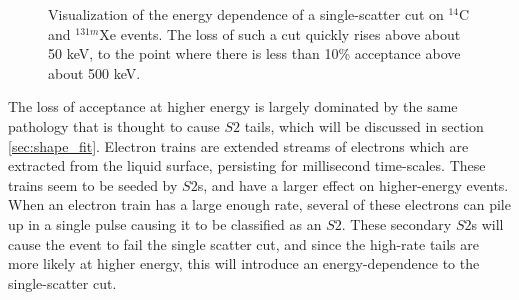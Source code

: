 {\begin{figure}[h!]
\begin{subfigure}{0.5\textwidth}
\end{subfigure}
\caption{Visualization of the energy dependence of a single-scatter cut on $^{14}$C and $^{131m}$Xe events. The loss of such a cut quickly rises above about 50 keV, to the point  where there is less than 10\% acceptance above about 500 keV.}
\label{fig:ssplot}
\end{figure}

The loss of acceptance at higher energy is largely dominated by the same pathology that is thought to cause $S2$ tails, which will be discussed in section \ref{sec:shape_fit}. Electron trains are extended streams of electrons which are extracted from the liquid surface, persisting for millisecond time-scales. These trains seem to be seeded by $S2$s, and have a larger effect on higher-energy events. When an electron train has a large enough rate, several of these electrons can pile up in a single pulse causing it to be classified as an $S2$. These secondary $S2$s will cause the event to fail the single scatter cut, and since the high-rate tails are more likely at higher energy, this will introduce an energy-dependence to the single-scatter cut.

}
